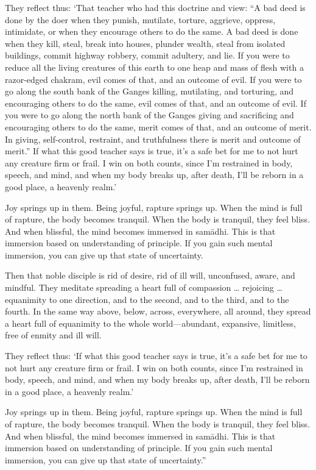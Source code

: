 \documentclass[12pt,openany]{book}%
\begin{document}
They reflect thus: ‘That teacher who had this doctrine and view: “A bad deed is done by the doer when they punish, mutilate, torture, aggrieve, oppress, intimidate, or when they encourage others to do the same. A bad deed is done when they kill, steal, break into houses, plunder wealth, steal from isolated buildings, commit highway robbery, commit adultery, and lie. If you were to reduce all the living creatures of this earth to one heap and mass of flesh with a razor-edged chakram, evil comes of that, and an outcome of evil. If you were to go along the south bank of the Ganges killing, mutilating, and torturing, and encouraging others to do the same, evil comes of that, and an outcome of evil. If you were to go along the north bank of the Ganges giving and sacrificing and encouraging others to do the same, merit comes of that, and an outcome of merit. In giving, self-control, restraint, and truthfulness there is merit and outcome of merit.” If what this good teacher says is true, it’s a safe bet for me to not hurt any creature firm or frail. I win on both counts, since I’m restrained in body, speech, and mind, and when my body breaks up, after death, I’ll be reborn in a good place, a heavenly realm.’ 

Joy springs up in them. Being joyful, rapture springs up. When the mind is full of rapture, the body becomes tranquil. When the body is tranquil, they feel bliss. And when blissful, the mind becomes immersed in \textsanskrit{samādhi}. This is that immersion based on understanding of principle. If you gain such mental immersion, you can give up that state of uncertainty. 

Then that noble disciple is rid of desire, rid of ill will, unconfused, aware, and mindful. They meditate spreading a heart full of compassion … rejoicing … equanimity to one direction, and to the second, and to the third, and to the fourth. In the same way above, below, across, everywhere, all around, they spread a heart full of equanimity to the whole world—abundant, expansive, limitless, free of enmity and ill will. 

They reflect thus: ‘If what this good teacher says is true, it’s a safe bet for me to not hurt any creature firm or frail. I win on both counts, since I’m restrained in body, speech, and mind, and when my body breaks up, after death, I’ll be reborn in a good place, a heavenly realm.’ 

Joy springs up in them. Being joyful, rapture springs up. When the mind is full of rapture, the body becomes tranquil. When the body is tranquil, they feel bliss. And when blissful, the mind becomes immersed in \textsanskrit{samādhi}. This is that immersion based on understanding of principle. If you gain such mental immersion, you can give up that state of uncertainty.” 
\end{document}
